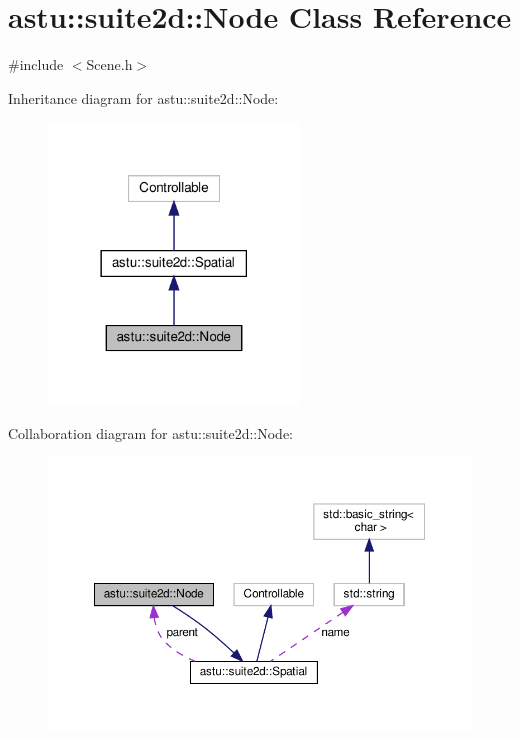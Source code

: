 \hypertarget{classastu_1_1suite2d_1_1Node}{}\section{astu\+:\+:suite2d\+:\+:Node Class Reference}
\label{classastu_1_1suite2d_1_1Node}


{\ttfamily \#include $<$Scene.\+h$>$}



Inheritance diagram for astu\+:\+:suite2d\+:\+:Node\+:\nopagebreak
\begin{figure}[H]
\begin{center}
\leavevmode
\includegraphics[width=189pt]{classastu_1_1suite2d_1_1Node__inherit__graph}
\end{center}
\end{figure}


Collaboration diagram for astu\+:\+:suite2d\+:\+:Node\+:\nopagebreak
\begin{figure}[H]
\begin{center}
\leavevmode
\includegraphics[width=350pt]{classastu_1_1suite2d_1_1Node__coll__graph}
\end{center}
\end{figure}
